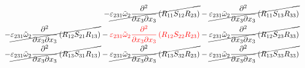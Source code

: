 \begin{equation}
\begin{split}
		-\cancel{\varepsilon_{231}\tilde{\omega}_{2}\pdv{}{x_{3}}{x_{3}}\left(R_{11}S_{12}R_{23}\right)}
		-\cancel{\varepsilon_{231}\tilde{\omega}_{2}\pdv{}{x_{3}}{x_{3}}\left(R_{11}S_{13}R_{33}\right)}\\
		-\cancel{\varepsilon_{231}\tilde{\omega}_{2}\pdv{}{x_{3}}{x_{3}}\left(R_{12}S_{21}R_{13}\right)}
		-{\color{red}\varepsilon_{231}\tilde{\omega}_{2}\pdv{}{x_{3}}{x_{3}}\left(R_{12}S_{22}R_{23}\right)}
		-\cancel{\varepsilon_{231}\tilde{\omega}_{2}\pdv{}{x_{3}}{x_{3}}\left(R_{12}S_{23}R_{33}\right)}\\
		-\cancel{\varepsilon_{231}\tilde{\omega}_{2}\pdv{}{x_{3}}{x_{3}}\left(R_{13}S_{31}R_{13}\right)}
		-\cancel{\varepsilon_{231}\tilde{\omega}_{2}\pdv{}{x_{3}}{x_{3}}\left(R_{13}S_{32}R_{23}\right)}
		-\cancel{\varepsilon_{231}\tilde{\omega}_{2}\pdv{}{x_{3}}{x_{3}}\left(R_{13}S_{33}R_{33}\right)}\\
	\end{split}
\end{equation}
